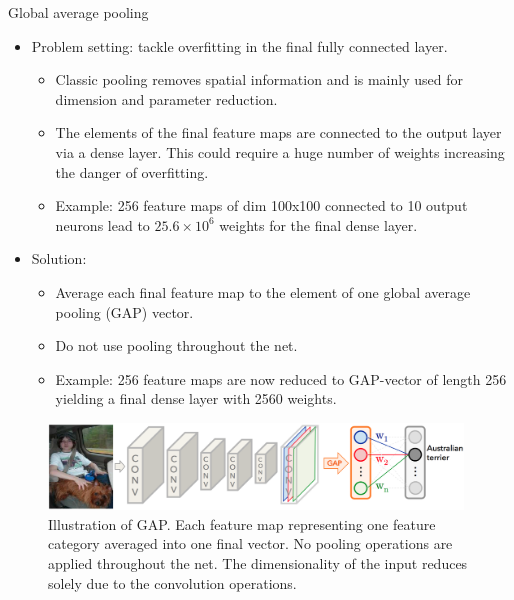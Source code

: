 \begin{vbframe}{Global average pooling}
    \begin{itemize}
        \item Problem setting: tackle overfitting in the final fully connected layer.
        \begin{itemize}
        \item Classic pooling removes spatial information and is mainly used for dimension and parameter reduction.
        \item The elements of the final feature maps are connected to the output layer via a dense layer. This could require a huge number of weights increasing the danger of overfitting.
        \item Example: 256 feature maps of dim 100x100 connected to 10 output neurons lead to $25.6\times 10^6$ weights for the final dense layer.
        \end{itemize}
        \framebreak 

        \item Solution: 
        \begin{itemize}
            \item Average each final feature map to the element of one global average pooling (GAP) vector.
            \item Do not use pooling throughout the net.
            \item Example: 256 feature maps are now reduced to GAP-vector of length 256 yielding a final dense layer with 2560 weights.
        \end{itemize}
    \end{itemize}

    \begin{figure}
        \centering
        \includegraphics[width=11cm]{plots/05_conv_variations/gap/GAP.png}
        \small{\caption{Illustration of GAP. Each feature map representing one feature category averaged into one final vector. No pooling operations are applied throughout the net. The dimensionality of the input reduces solely due to the convolution operations. }}
    \end{figure}

\framebreak


\end{vbframe}
